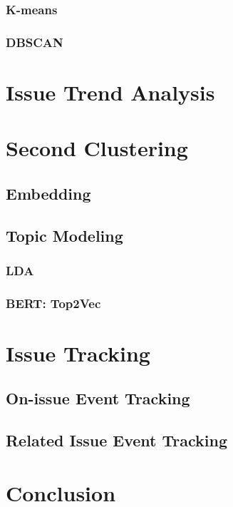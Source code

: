 \documentclass{article}
\begin{document}
\subsubsection{K-means}

\subsubsection{DBSCAN}


\section{Issue Trend Analysis}


\section{Second Clustering}

\subsection{Embedding}

\subsection{Topic Modeling}
\subsubsection{LDA}

\subsubsection{BERT: Top2Vec}


\section{Issue Tracking}

\subsection{On-issue Event Tracking}

\subsection{Related Issue Event Tracking}


\section{Conclusion}

\end{document}
